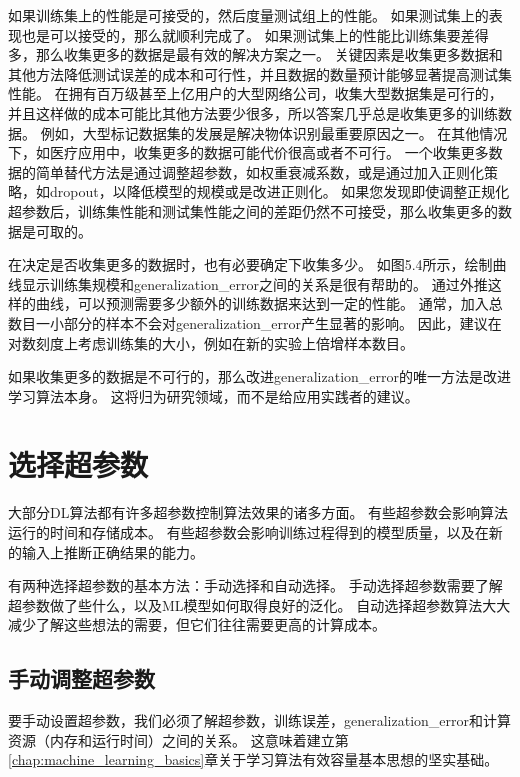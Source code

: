
如果训练集上的性能是可接受的，然后度量测试组上的性能。
如果测试集上的表现也是可以接受的，那么就顺利完成了。
如果测试集上的性能比训练集要差得多，那么收集更多的数据是最有效的解决方案之一。
关键因素是收集更多数据和其他方法降低测试误差的成本和可行性，并且数据的数量预计能够显著提高测试集性能。
在拥有百万级甚至上亿用户的大型网络公司，收集大型数据集是可行的，并且这样做的成本可能比其他方法要少很多，所以答案几乎总是收集更多的训练数据。
例如，大型标记数据集的发展是解决物体识别最重要原因之一。
在其他情况下，如医疗应用中，收集更多的数据可能代价很高或者不可行。
一个收集更多数据的简单替代方法是通过调整超参数，如权重衰减系数，或是通过加入正则化策略，如\gls{dropout}，以降低模型的规模或是改进正则化。
如果您发现即使调整正规化超参数后，训练集性能和测试集性能之间的差距仍然不可接受，那么收集更多的数据是可取的。

在决定是否收集更多的数据时，也有必要确定下收集多少。
如图5.4所示，绘制曲线显示训练集规模和\gls{generalization_error}之间的关系是很有帮助的。
通过外推这样的曲线，可以预测需要多少额外的训练数据来达到一定的性能。
通常，加入总数目一小部分的样本不会对\gls{generalization_error}产生显著的影响。
因此，建议在对数刻度上考虑训练集的大小，例如在新的实验上倍增样本数目。

如果收集更多的数据是不可行的，那么改进\gls{generalization_error}的唯一方法是改进学习算法本身。
这将归为研究领域，而不是给应用实践者的建议。

\section{选择超参数}
\label{sec:selecting_hyperparameters}
大部分\gls{DL}算法都有许多超参数控制算法效果的诸多方面。
有些超参数会影响算法运行的时间和存储成本。
有些超参数会影响训练过程得到的模型质量，以及在新的输入上推断正确结果的能力。


有两种选择超参数的基本方法：手动选择和自动选择。
手动选择超参数需要了解超参数做了些什么，以及\gls{ML}模型如何取得良好的泛化。
自动选择超参数算法大大减少了解这些想法的需要，但它们往往需要更高的计算成本。

\subsection{手动调整超参数}
\label{sec:manual_hyperparameter_tuning}
要手动设置超参数，我们必须了解超参数，训练误差，\gls{generalization_error}和计算资源（内存和运行时间）之间的关系。
这意味着建立第\ref{chap:machine_learning_basics}章关于学习算法有效容量基本思想的坚实基础。

